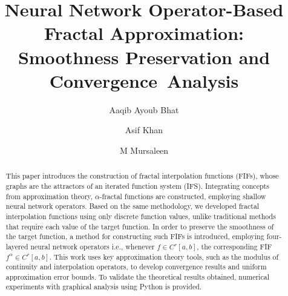 \documentclass{article}[12pt, a4]
\begin{document}
	
	\thispagestyle{empty}
	
	\title{\Large Neural Network Operator-Based Fractal Approximation: Smoothness Preservation and Convergence Analysis}
	
	\author[a]{Aaqib Ayoub Bhat}
	
	\author[a]{Asif Khan}
	
	
	\author[a,b,c,*]{M Mursaleen}%








\date{}

\maketitle

\let\thefootnote\relax{}



\begin{abstract}
	This paper introduces the construction of fractal interpolation functions (FIFs), whose graphs are the attractors of an iterated function system (IFS). Integrating concepts from approximation theory, $\alpha$-fractal functions are constructed, employing shallow neural network operators. Based on the same methodology, we developed fractal interpolation functions using only discrete function values, unlike traditional methods that require each value of the target function. In order to preserve the smoothness of the target function, a method for constructing such FIFs is introduced, employing four-layered neural network operators i.e., whenever $f \in C^{r}[a,b]$, the corresponding FIF $f^{\alpha} \in C^{r}[a,b]$. This work uses key approximation theory tools, such as the modulus of continuity and interpolation operators, to develop convergence results and uniform approximation error bounds. To validate the theoretical results obtained, numerical experiments with graphical analysis using Python is provided.
	
	
	
\end{abstract}
\end{document}
